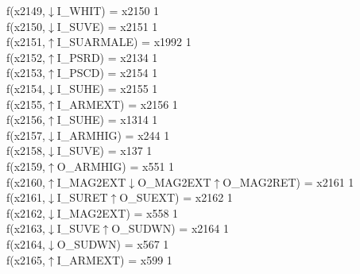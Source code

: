 f(x2149,$\downarrow$I\_WHIT) = x2150 {1} \\
f(x2150,$\downarrow$I\_SUVE) = x2151 {1} \\
f(x2151,$\uparrow$I\_SUARMALE) = x1992 {1} \\
f(x2152,$\uparrow$I\_PSRD) = x2134 {1} \\
f(x2153,$\uparrow$I\_PSCD) = x2154 {1} \\
f(x2154,$\downarrow$I\_SUHE) = x2155 {1} \\
f(x2155,$\uparrow$I\_ARMEXT) = x2156 {1} \\
f(x2156,$\uparrow$I\_SUHE) = x1314 {1} \\
f(x2157,$\downarrow$I\_ARMHIG) = x244 {1} \\
f(x2158,$\downarrow$I\_SUVE) = x137 {1} \\
f(x2159,$\uparrow$O\_ARMHIG) = x551 {1} \\
f(x2160,$\uparrow$I\_MAG2EXT$\downarrow$O\_MAG2EXT$\uparrow$O\_MAG2RET) = x2161 {1} \\
f(x2161,$\downarrow$I\_SURET$\uparrow$O\_SUEXT) = x2162 {1} \\
f(x2162,$\downarrow$I\_MAG2EXT) = x558 {1} \\
f(x2163,$\downarrow$I\_SUVE$\uparrow$O\_SUDWN) = x2164 {1} \\
f(x2164,$\downarrow$O\_SUDWN) = x567 {1} \\
f(x2165,$\uparrow$I\_ARMEXT) = x599 {1} \\
